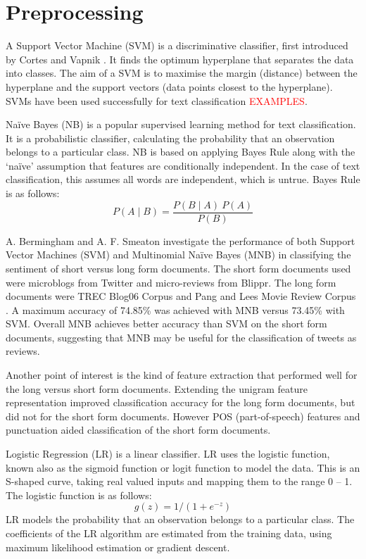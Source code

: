 \section{Preprocessing}

A Support Vector Machine (SVM) is a discriminative classifier, first introduced by Cortes and Vapnik \cite{Vapnik1995,Vapnik21995}. It finds the optimum hyperplane that separates the data into classes. The aim of a SVM is to maximise the margin (distance) between the hyperplane and the support vectors (data points closest to the hyperplane). SVMs have been used successfully for text classification \textcolor{red}{EXAMPLES}.

Naïve Bayes (NB) is a popular supervised learning method for text classification. It is a probabilistic classifier, calculating the probability that an observation belongs to a particular class. NB is based on applying Bayes Rule along with the ‘naïve’ assumption that features are conditionally independent. In the case of text classification, this assumes all words are independent, which is untrue. Bayes Rule is as follows:  \[P(A\mid B)=\frac{P(B\mid A)\:P(A)}{P(B)}\] 

A. Bermingham and A. F. Smeaton \cite{Berm2010} investigate the performance of both Support Vector Machines (SVM) and Multinomial Naïve Bayes (MNB) in classifying the sentiment of short versus long form documents. The short form documents used were microblogs from Twitter and micro-reviews from Blippr. The long form documents were TREC Blog06 Corpus and Pang and Lees Movie Review Corpus \cite{panglee2004}. A maximum accuracy of 74.85\% was achieved with MNB versus 73.45\% with SVM. Overall MNB achieves better accuracy than SVM on the short form documents, suggesting that MNB may be useful for the classification of tweets as reviews.

Another point of interest is the kind of feature extraction that performed well for the long versus short form documents. Extending the unigram feature representation improved classification accuracy for the long form documents, but did not for the short form documents. However POS (part-of-speech) features and punctuation aided classification of the short form documents. 

Logistic Regression (LR) is a linear classifier. LR uses the logistic function, known also as the sigmoid function or logit function to model the data. This is an S-shaped curve, taking real valued inputs and mapping them to the range 0 – 1. The logistic function is as follows: \[g(z)=1/(1+e^{-z})\]
LR models the probability that an observation belongs to a particular class. The coefficients of the LR algorithm are estimated from the training data, using maximum likelihood estimation or gradient descent.

